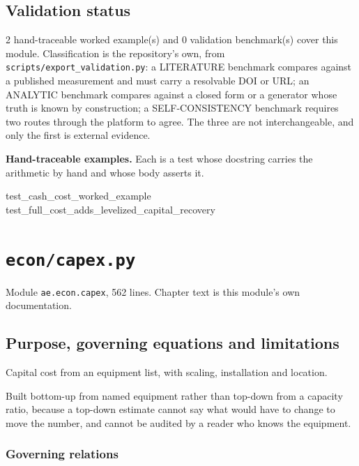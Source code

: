 \documentclass[10pt,a4paper,twoside]{report}
\begin{document}
\section{Validation status}

2 hand-traceable worked example(s) and 0 validation benchmark(s) cover this module. Classification is the repository's own, from \texttt{scripts/export\_validation.py}: a LITERATURE benchmark compares against a published measurement and must carry a resolvable DOI or URL; an ANALYTIC benchmark compares against a closed form or a generator whose truth is known by construction; a SELF-CONSISTENCY benchmark requires two routes through the platform to agree. The three are not interchangeable, and only the first is external evidence.

\textbf{Hand-traceable examples.} Each is a test whose docstring carries the arithmetic by hand and whose body asserts it.

\begin{verbatimsmall}
test_cash_cost_worked_example
test_full_cost_adds_levelized_capital_recovery
\end{verbatimsmall}

\clearpage

\chapter{\texttt{econ/capex.py}}\label{ch:capex}


{\footnotesize\color{slate}Module \texttt{ae.econ.capex}, 562 lines. Chapter text is this module's own documentation.\par}

\section{Purpose, governing equations and limitations}

Capital cost from an equipment list, with scaling, installation and location.

Built bottom-up from named equipment rather than top-down from a capacity ratio, because a top-down estimate cannot say what would have to change to move the number, and cannot be audited by a reader who knows the equipment.

\subsection*{Governing relations}
\end{document}

